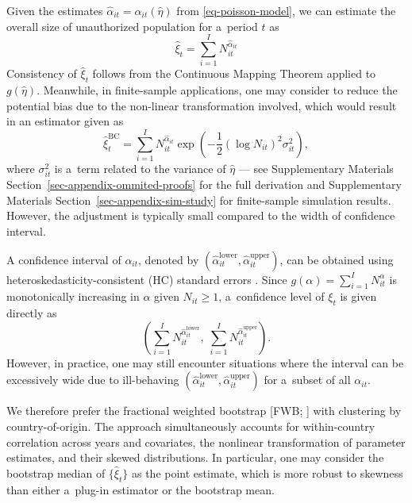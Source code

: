 Given the estimates $\hat{\alpha}_{it} = \alpha_{it}(\hat{\eta})$ from \eqref{eq-poisson-model}, we can estimate the overall size of unauthorized population for a~period $t$ as
\begin{equation}\label{eq-estimators}
\hat{\xi}_{t} = \sum_{i=1}^{I} N_{it}^{\hat{\alpha}_{it}} 
\end{equation}
Consistency of $\hat{\xi}_t$ follows from the Continuous Mapping Theorem applied to $g(\hat{\eta})$. Meanwhile, in finite-sample applications, one may consider to reduce the potential bias due to the non-linear transformation involved, which would result in an estimator given as 
\begin{equation}\label{eq-bias-correction}
\hat{\xi}_t^{\text{BC}} = \sum_{i=1}^{I} N_{it}^{\hat{\alpha}_{it}} \exp\left(-\frac{1}{2} (\log N_{it})^2 \sigma_{it}^2 \right),
\end{equation}
where $\sigma_{it}^2$ is a~term related to the variance of $\hat{\eta}$ --- see Supplementary Materials Section~\ref{sec-appendix-ommited-proofs} for the full derivation and Supplementary Materials Section~\ref{sec-appendix-sim-study} for finite-sample simulation results. However, the adjustment is typically small compared to the width of confidence interval. 

A confidence interval of $\alpha_{it}$, denoted by $(\hat{\alpha}_{it}^{\text{lower}}, \hat{\alpha}_{it}^{\text{upper}})$, can be obtained using heteroskedasticity-consistent (HC) standard errors \citep{mackinnon1985some}. Since $g(\alpha) = \sum_{i=1}^{I} N_{it}^{\alpha}$ is monotonically increasing in $\alpha$ given $N_{it} \geq 1$, a~confidence level of $\xi_t$ is given directly as
\begin{equation}\label{eq-xi-confint}
\left( \sum_{i=1}^{I} N_{it}^{\hat{\alpha}_{it}^{\text{lower}}}, \;
\sum_{i=1}^{I} N_{it}^{\hat{\alpha}_{it}^{\text{upper}}} \right).
\end{equation}
However, in practice, one may still encounter situations where the interval can be excessively wide due to ill-behaving $(\hat{\alpha}_{it}^{\text{lower}}, \hat{\alpha}_{it}^{\text{upper}})$ for a~subset of all $\alpha_{it}$.

We therefore prefer the fractional weighted bootstrap {[}FWB; \citet{XuEtAl2020}{]} with clustering by country-of-origin.
The approach simultaneously accounts for within-country correlation across years and covariates, the nonlinear transformation of parameter estimates, and their skewed distributions. In particular, one may consider the bootstrap median of $\{\hat{\xi}_t\}$ as the point estimate, which is more robust to skewness than either a~plug-in estimator or the bootstrap mean.

